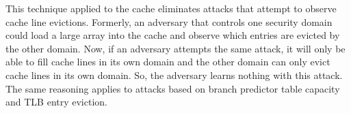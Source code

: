 This technique applied to the cache eliminates attacks that attempt to observe 
cache line evictions. Formerly, an adversary that controls one security domain 
could load a large array into the cache and observe which entries are evicted 
by the other domain. Now, if an adversary attempts the same attack, it will 
only be able to fill cache lines in its own domain and the other domain can 
only evict cache lines in its own domain. So, the adversary learns nothing with 
this attack. The same reasoning applies to attacks based on branch predictor 
table capacity and TLB entry eviction.

